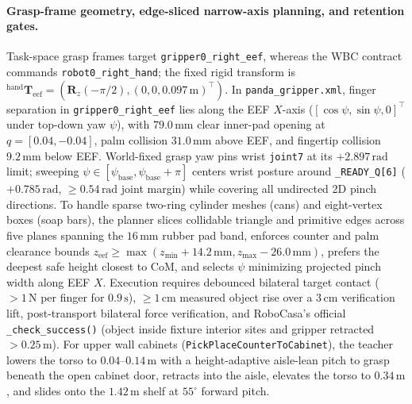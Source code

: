 \paragraph{Grasp-frame geometry, edge-sliced narrow-axis planning, and retention gates.}
Task-space grasp frames target \texttt{gripper0\_right\_eef}, whereas the WBC
contract commands \texttt{robot0\_right\_hand}; the fixed rigid transform is
${}^{\text{hand}}\mathbf{T}_{\text{eef}} = (\mathbf{R}_z(-\pi/2), (0, 0, 0.097\,\text{m})^\top)$.
In \texttt{panda\_gripper.xml}, finger separation in \texttt{gripper0\_right\_eef}
lies along the EEF $X$-axis ($[\cos\psi, \sin\psi, 0]^\top$ under top-down yaw
$\psi$), with $79.0\,\text{mm}$ clear inner-pad opening at $q = [0.04, -0.04]$,
palm collision $31.0\,\text{mm}$ above EEF, and fingertip collision $9.2\,\text{mm}$
below EEF. World-fixed grasp yaw pins wrist \texttt{joint7} at its $+2.897\,\text{rad}$
limit; sweeping $\psi \in [\psi_{\text{base}}, \psi_{\text{base}} + \pi]$ centers
wrist posture around \texttt{\_READY\_Q[6]} ($+0.785\,\text{rad}$, $\ge 0.54\,\text{rad}$
joint margin) while covering all undirected 2D pinch directions.
To handle sparse two-ring cylinder meshes (cans) and eight-vertex boxes (soap
bars), the planner slices collidable triangle and primitive edges across five
planes spanning the $16\,\text{mm}$ rubber pad band, enforces counter and palm
clearance bounds $z_{\text{eef}} \ge \max(z_{\min} + 14.2\,\text{mm}, z_{\max} - 26.0\,\text{mm})$,
prefers the deepest safe height closest to CoM, and selects $\psi$ minimizing
projected pinch width along EEF $X$. Execution requires debounced bilateral
target contact ($>1\,\text{N}$ per finger for $0.9\,\text{s}$), $\ge 1\,\text{cm}$
measured object rise over a $3\,\text{cm}$ verification lift, post-transport
bilateral force verification, and RoboCasa's official \texttt{\_check\_success()}
(object inside fixture interior sites and gripper retracted $>0.25\,\text{m}$).
For upper wall cabinets (\texttt{PickPlaceCounterToCabinet}), the teacher lowers
the torso to $0.04\text{--}0.14\,\text{m}$ with a height-adaptive aisle-lean pitch to
grasp beneath the open cabinet door, retracts into the aisle, elevates the torso
to $0.34\,\text{m}$, and slides onto the $1.42\,\text{m}$ shelf at $55^\circ$
forward pitch.

